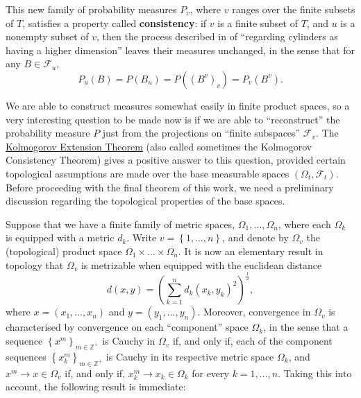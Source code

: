 This new family of probability measures \(P_v\), where \(v\) ranges over the finite subsets of \(T\), satisfies a property called \textbf{consistency}: if \(v\) is a finite subset of \(T\), and \(u\) is a nonempty subset of \(v\), then the process described in  of ``regarding cylinders as having a higher dimension'' leaves their measures unchanged, in the sense that for any \(B\in\mathcal{F}_u\),
\[
		P_u(B)=P\left(B_u\right)=P\left((B^v)_v\right)=P_v(B^v)
.\]

We are able to construct measures somewhat easily in finite product spaces, so a very interesting question to be made now is if we are able to ``reconstruct'' the probability measure \(P\) just from the projections on ``finite subspaces'' \(\mathcal{F}_v\). The \hyperref[theorem:Kolmogorov Extension]{Kolmogorov Extension Theorem} (also called sometimes the Kolmogorov Consistency Theorem) gives a positive answer to this question, provided certain topological assumptions are made over the base measurable spaces \(\left(\Omega_t,\mathcal{F}_t\right)\). Before proceeding with the final theorem of this work, we need a preliminary discussion regarding the topological properties of the base spaces.

Suppose that we have a finite family of metric spaces, \(\Omega_1,\dots,\Omega_n\), where each \(\Omega_k\) is equipped with a metric \(d_k\). Write \(v=\left\{1,\dots,n\right\}\), and denote by \(\Omega_v\) the (topological) product space \(\Omega_1\times\dots\times\Omega_n\). It is now an elementary result in topology that \(\Omega_v\) is metrizable when equipped with the euclidean distance
\[
		d(x,y)=\left(\sum_{k=1}^{n} d_k(x_k,y_k)^2\right)^{\frac{1}{2}}
,\]
where \(x=\left(x_1,\dots,x_n\right)\) and \(y=\left(y_1,\dots,y_n\right)\). Moreover, convergence in \(\Omega_v\) is characterised by convergence on each ``component'' space \(\Omega_k\), in the sense that a sequence \(\left\{x^m\right\}_{m\in\mathbb{Z}^{+}}\) is Cauchy in \(\Omega_v\) if, and only if, each of the component sequences \(\left\{x^m_k\right\}_{m\in\mathbb{Z}^{+}}\) is Cauchy in its respective metric space \(\Omega_{k}\), and \(x^m\to x\in\Omega_v\) if, and only if, \(x^m_k\to x_k\in\Omega_k\) for every \(k=1,\dots,n\). Taking this into account, the following result is immediate:

